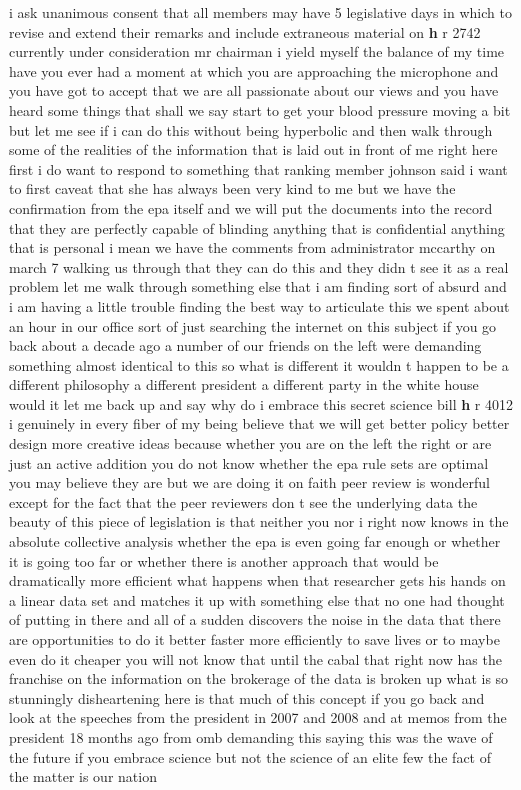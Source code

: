 \documentclass{article}
\begin{document}
\vspace{8mm}
i ask unanimous consent that all members may have 5 legislative days in which to revise and extend their remarks and include extraneous material on {\bf \color{red} h} r 2742 currently under consideration
\vspace{8mm}
mr chairman i yield myself the balance of my time have you ever had a moment at which you are approaching the microphone and you have got to accept that we are all passionate about our views and you have heard some things that shall we say start to get your blood pressure moving a bit but let me see if i can do this without being hyperbolic and then walk through some of the realities of the information that is laid out in front of me right here first i do want to respond to something that ranking member johnson said i want to first caveat that she has always been very kind to me but we have the confirmation from the epa itself and we will put the documents into the record that they are perfectly capable of blinding anything that is confidential anything that is personal i mean we have the comments from administrator mccarthy on march 7 walking us through that they can do this and they didn t see it as a real problem let me walk through something else that i am finding sort of absurd and i am having a little trouble finding the best way to articulate this we spent about an hour in our office sort of just searching the internet on this subject if you go back about a decade ago a number of our friends on the left were demanding something almost identical to this so what is different it wouldn t happen to be a different philosophy a different president a different party in the white house would it let me back up and say why do i embrace this secret science bill {\bf \color{red} h} r 4012 i genuinely in every fiber of my being believe that we will get better policy better design more creative ideas because whether you are on the left the right or are just an active addition you do not know whether the epa rule sets are optimal you may believe they are but we are doing it on faith peer review is wonderful except for the fact that the peer reviewers don t see the underlying data the beauty of this piece of legislation is that neither you nor i right now knows in the absolute collective analysis whether the epa is even going far enough or whether it is going too far or whether there is another approach that would be dramatically more efficient what happens when that researcher gets his hands on a linear data set and matches it up with something else that no one had thought of putting in there and all of a sudden discovers the noise in the data that there are opportunities to do it better faster more efficiently to save lives or to maybe even do it cheaper you will not know that until the cabal that right now has the franchise on the information on the brokerage of the data is broken up what is so stunningly disheartening here is that much of this concept if you go back and look at the speeches from the president in 2007 and 2008 and at memos from the president 18 months ago from omb demanding this saying this was the wave of the future if you embrace science but not the science of an elite few the fact of the matter is our nation 
\end{document}
